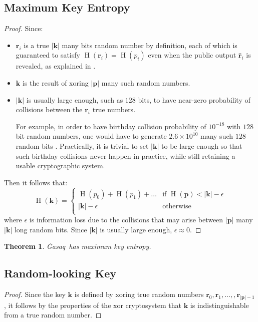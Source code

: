 \documentclass[twocolumn,hidelinks]{article}
\newcommand{\ghasaq}{Ġasaq}
\DeclareMathOperator{\entropy}{H}
\newtheorem{theorem}{Theorem}[section]
\begin{document}
\subsection{Maximum Key Entropy}
\begin{proof}
    Since:
    \begin{itemize}
        \item $\mathbf{r}_i$ is a true $|\mathbf{k}|$ many bits random
            number by definition, each of which is guaranteed to satisfy
            $\entropy(\mathbf{r}_i) = \entropy(p_i)$ even when the public
            output $\mathbf{\hat r}_i$ is revealed, as explained in
            .
        \item $\mathbf{k}$ is the result of \gls{xor}ing $|\mathbf{p}|$
            many such random numbers.
        \item $|\mathbf{k}|$ is usually large enough, such as $128$ bits,
            to have near-zero probability of collisions between the
            $\mathbf{r}_i$ true numbers.

            For example, in order to have birthday collision probability of
            $10^{-18}$ with $128$ bit random numbers, one would have to
            generate $2.6 \times 10^{10}$ many such $128$ random bits
            \cite{birthdayattack}. Practically, it is trivial to set
            $|\mathbf{k}|$ to be large enough so that such birthday
            collisions never happen in practice, while still retaining a
            usable cryptographic system.
    \end{itemize}
    Then it follows that:
    \[
        \entropy(\mathbf{k})
        = \begin{cases}
            \entropy(p_0) + \entropy(p_1) + \ldots & \text{if }
            \entropy(\mathbf{p}) < |\mathbf{k}| - \epsilon\\
            |\mathbf{k}| - \epsilon & \text{otherwise}\\
        \end{cases}
    \]
    where $\epsilon$ is information loss due to the collisions that may
    arise between $|\mathbf{p}|$ many $|\mathbf{k}|$ long random bits.
    Since $|\mathbf{k}|$ is usually large enough, $\epsilon \approx 0$.
\end{proof}

\begin{theorem}
    \ghasaq\ has maximum key entropy.
\end{theorem}

\subsection{Random-looking Key}
\begin{proof}
    Since the key $\mathbf{k}$ is defined by \gls{xor}ing true random
    numbers $\mathbf{r}_0, \mathbf{r}_1, \ldots, ,
    \mathbf{r}_{|\mathbf{p}|-1}$, it follows by the properties of the
    \gls{xor} cryptosystem that $\mathbf{k}$ is indistinguishable from a
    true random number.
\end{proof}
\end{document}
